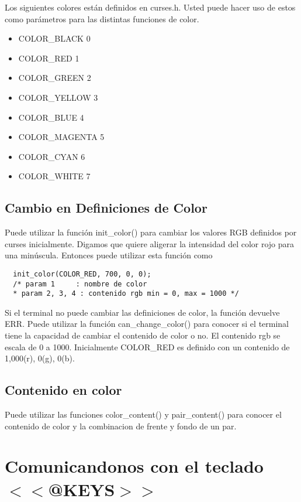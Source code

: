 \documentclass{article}
\begin{document}
Los siguientes colores están definidos en curses.h. Usted puede hacer uso de
estos como parámetros para las distintas funciones de color.\\

\begin{itemize}
  \item COLOR\_BLACK   0
  \item COLOR\_RED     1
  \item COLOR\_GREEN   2
  \item COLOR\_YELLOW  3
  \item COLOR\_BLUE    4
  \item COLOR\_MAGENTA 5
  \item COLOR\_CYAN    6
  \item COLOR\_WHITE   7
\end{itemize}

\subsection{Cambio en Definiciones de Color}%
Puede utilizar la función init\_color() para cambiar los valores RGB definidos
por curses inicialmente. Digamos que quiere aligerar la intensidad del color
rojo para una minúscula. Entonces puede utilizar esta función como

\begin{verbatim}
  init_color(COLOR_RED, 700, 0, 0);
  /* param 1     : nombre de color
  * param 2, 3, 4 : contenido rgb min = 0, max = 1000 */
\end{verbatim}

Si el terminal no puede cambiar las definiciones de color, la función devuelve
ERR. Puede utilizar la función can\_change\_color() para conocer si el terminal
tiene la capacidad de cambiar el contenido de color o no. El contenido rgb se
escala de 0 a 1000. Inicialmente COLOR\_RED es definido con un contenido de
1,000(r), 0(g), 0(b).

\subsection{Contenido en color}%
Puede utilizar las funciones color\_content() y pair\_content() para conocer
el contenido de color y la combinacion de frente y fondo de un par.

\section{Comunicandonos con el teclado $<<$@KEYS$>>$}%
\end{document}
